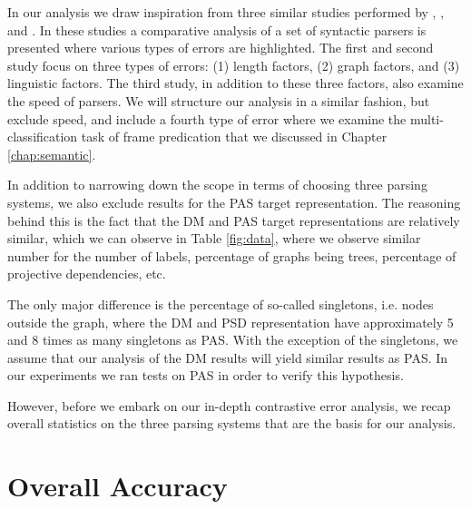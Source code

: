In our analysis we draw inspiration from three similar studies performed by , , and . In these studies a comparative analysis of a set of syntactic parsers is presented where various types of errors are highlighted. The first and second study focus on three types of errors: (1) length factors, (2) graph factors, and (3) linguistic factors. The third study, in addition to these three factors, also examine the speed of parsers. We will structure our analysis in a similar fashion, but exclude speed, and include a fourth type of error where we examine the multi-classification task of frame predication that we discussed in Chapter \ref{chap:semantic}.

In addition to narrowing down the scope in terms of choosing three parsing systems, we also exclude results for the PAS target representation. The reasoning behind this is the fact that the DM and PAS target representations are relatively similar, which we can observe in Table \ref{fig:data}, where we observe similar number for the number of labels, percentage of graphs being trees, percentage of projective dependencies, etc. 

The only major difference is the percentage of so-called singletons, i.e. nodes outside the graph, where the DM and PSD representation have approximately 5 and 8 times as many singletons as PAS. With the exception of the singletons, we assume that our analysis of the DM results will yield similar results as PAS. In our experiments we ran tests on PAS in order to verify this hypothesis.

However, before we embark on our in-depth contrastive error analysis, we recap overall statistics on the three parsing systems that are the basis for our analysis.

\section{Overall Accuracy}

